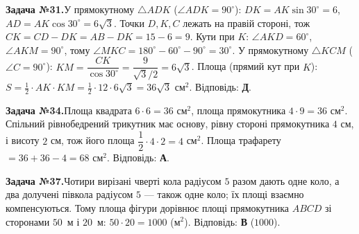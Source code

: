 \documentclass[12pt]{article}
\begin{document}
\par\vspace{0.3cm}\noindent\hypertarget{sol:31}{}
\begin{tcolorbox}[colback=titleBg!40, colframe=mainGreen!55, boxrule=0.4pt, arc=2pt, left=6pt, right=6pt, top=4pt, bottom=4pt, breakable]
\noindent\small\textbf{Задача №31.}\quad У прямокутному $\triangle ADK$ ($\angle ADK=90^\circ$): $DK=AK\sin30^\circ=6$, $AD=AK\cos30^\circ=6\sqrt3$. Точки $D,K,C$ лежать на правій стороні, тож $CK=CD-DK=AB-DK=15-6=9$. Кути при $K$: $\angle AKD=60^\circ$, $\angle AKM=90^\circ$, тому $\angle MKC=180^\circ-60^\circ-90^\circ=30^\circ$. У прямокутному $\triangle KCM$ ($\angle C=90^\circ$): $KM=\dfrac{CK}{\cos30^\circ}=\dfrac{9}{\sqrt3/2}=6\sqrt3$. Площа (прямий кут при $K$): $S=\tfrac12\cdot AK\cdot KM=\tfrac12\cdot12\cdot6\sqrt3=36\sqrt3$ см$^2$. Відповідь: \textbf{Д}.
\par\vspace{0.1cm}\hfill\hyperlink{task:31}{}
\end{tcolorbox}
\par\vspace{0.3cm}\noindent\hypertarget{sol:34}{}
\begin{tcolorbox}[colback=titleBg!40, colframe=mainGreen!55, boxrule=0.4pt, arc=2pt, left=6pt, right=6pt, top=4pt, bottom=4pt, breakable]
\noindent\small\textbf{Задача №34.}\quad Площа квадрата $6\cdot 6=36$ см$^2$, площа прямокутника $4\cdot 9=36$ см$^2$. Спільний рівнобедрений трикутник має основу, рівну стороні прямокутника $4$ см, і висоту $2$ см, тож його площа $\dfrac{1}{2}\cdot 4\cdot 2=4$ см$^2$. Площа трафарету $=36+36-4=68$ см$^2$. Відповідь: \textbf{А}.
\par\vspace{0.1cm}\hfill\hyperlink{task:34}{}
\end{tcolorbox}
\par\vspace{0.3cm}\noindent\hypertarget{sol:37}{}
\begin{tcolorbox}[colback=titleBg!40, colframe=mainGreen!55, boxrule=0.4pt, arc=2pt, left=6pt, right=6pt, top=4pt, bottom=4pt, breakable]
\noindent\small\textbf{Задача №37.}\quad Чотири вирізані чверті кола радіусом $5$ разом дають одне коло, а два долучені півкола радіусом $5$ — також одне коло; їх площі взаємно компенсуються. Тому площа фігури дорівнює площі прямокутника $ABCD$ зі сторонами $50$~м і $20$~м: $50\cdot20=1000$ (м$^2$). Відповідь: \textbf{В} ($1000$).
\par\vspace{0.1cm}\hfill\hyperlink{task:37}{}
\end{tcolorbox}
\end{document}
